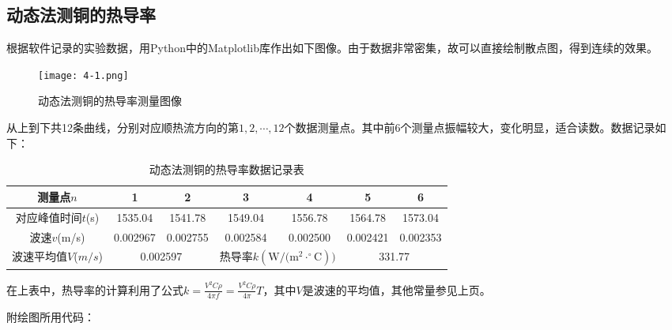 \documentclass[12pt]{article}
\begin{document}
\newpage

\subsection{动态法测铜的热导率}
根据软件记录的实验数据，用Python中的Matplotlib库作出如下图像。由于数据非常密集，故可以直接绘制散点图，得到连续的效果。

\begin{figure}[htbp]
    \centering
    \texttt{[image: 4-1.png]}
    \caption{动态法测铜的热导率测量图像}
\end{figure}

从上到下共12条曲线，分别对应顺热流方向的第$1,2,\cdots,12$个数据测量点。其中前6个测量点振幅较大，变化明显，适合读数。数据记录如下：

\begin{table}[htbp]
    \centering
    \begin{tabular}{|c|c|c|c|c|c|c|}
    \hline
    测量点$n$ & 1    & 2    & 3    & 4    & 5    & 6 \\
    \hline
    对应峰值时间$t$(s) & 1535.04 & 1541.78 & 1549.04 & 1556.78 & 1564.78 & 1573.04 \\
    \hline
    波速$v$(m/s) & 0.002967  & 0.002755  & 0.002584  & 0.002500  & 0.002421  & 0.002353  \\
    \hline
    波速平均值$V$($m/s$) & \multicolumn{2}{|c|}{0.002597}& \multicolumn{2}{|c|}{热导率$k(\mathrm{W/(m^2}\cdot^{\circ}\mathrm{C}))$}  & \multicolumn{2}{|c|}{331.77} \\
    \hline
    \end{tabular}
    \caption{动态法测铜的热导率数据记录表}
\end{table}

在上表中，热导率的计算利用了公式$k=\frac{V^2C\rho}{4\pi f}=\frac{V^2C\rho}{4\pi}T$，其中$V$是波速的平均值，其他常量参见上页。

附绘图所用代码：
\end{document}
